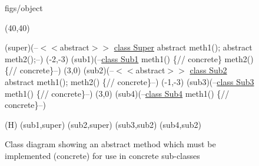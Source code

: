 





\begin {figure}


\Draw

 {figs/object}

\MinNodeSize(40,40)

\RectNode(super)(--$<<$abstract$>>$
      		\underline{class Super}
		abstract meth1();
		abstract meth2();--)
\MoveToExit(-2,-3)
\RectNode(sub1)(--\underline{class Sub1}
		meth1()
		\{// concrete\}
		meth2()
		\{// concrete\}--)
\MoveToExit(3,0)
\RectNode(sub2)(--$<<$abstract$>>$
      		\underline{class Sub2}
		abstract meth1();
		 meth2()
		\{// concrete\}--)
\MoveToExit(-1,-3)
\RectNode(sub3)(--\underline{class Sub3}
		meth1()
		\{// concrete\}--)
\MoveToExit(3,0)
\RectNode(sub4)(--\underline{class Sub4}
		meth1()
		\{// concrete\}--)

\ArrowSpec(H)
\Edge(sub1,super)
\Edge(sub2,super)
\Edge(sub3,sub2)
\Edge(sub4,sub2)

\EndDraw

\caption {Class diagram showing an abstract method which 
must be implemented (concrete) for use in concrete sub-classes}


\label {fig:abstrMeth}

\end {figure}


